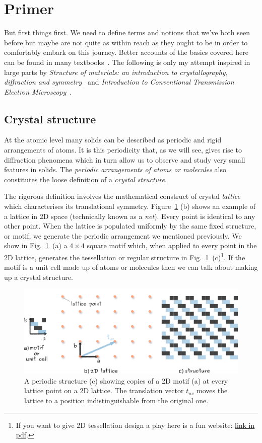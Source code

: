 \section{Primer}
But first things first. We need to define terms and notions that we've both seen before but maybe are not quite as within reach as they ought to be in order to comfortably embark on this journey. Better accounts of the basics covered here can be found in many textbooks~\cite{electronMicroscopy,Williams96,reimerSEM}. The following is only my attempt inspired in large parts by \textit{Structure of materials: an introduction to crystallography, diffraction and symmetry}~\cite{SoM} and \textit{Introduction to Conventional Transmission Electron Microscopy}~\cite{MarcTEM03}.

\subsection{Crystal structure}
\label{Sec:crystalStruct}
At the atomic level many solids can be described as periodic and rigid arrangements of atoms. It is this periodicity that, as we will see, gives rise to diffraction phenomena which in turn allow us to observe and study very small features in solids. The \textit{periodic arrangements of atoms or molecules} also constitutes the loose definition of a \textit{crystal structure}.

The rigorous definition involves the mathematical construct of crystal \textit{lattice} which characterises its translational symmetry. Figure~\ref{Fig:motif} (b) shows an example of a lattice in 2D space (technically known as a \textit{net}). Every point is identical to any other point. When the lattice is populated uniformly by the same fixed structure, or motif, we generate the periodic arrangement we mentioned previously. We show in Fig.~\ref{Fig:motif}~(a) a $4\times4$ square motif which, when applied to every point in the 2D lattice, generates the tessellation or regular structure in Fig.~\ref{Fig:motif}~(c)\footnote{If you want to give 2D tessellation design a play here is a fun website: \href{http://gwydir.demon.co.uk/jo/tess/tess.htm}{link in pdf}.}. If the motif is a unit cell made up of atoms or molecules then we can talk about making up a crystal structure. 


\begin{figure}[ht]
    \centering
\includegraphics[width=0.9\linewidth]{Figures/motif.png}
\caption[2D crystal lattice definition.]{A periodic structure (c) showing copies of a 2D motif (a) at every lattice point on a 2D lattice. The translation vector $t_{uv}$ moves the lattice to a position indistinguishable from the original one.}
\label{Fig:motif}
\end{figure}





